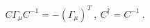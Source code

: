\begin{equation}
 C \Gamma_{\mu} C^{-1} = - (\Gamma_{\mu})^{T} ~,~ C^{\dagger} = C^{-1} ~.
\end{equation}

